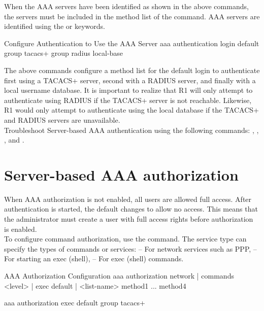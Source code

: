 When the AAA servers have been identified as shown in the above commands, the servers must be included in the method list of the  command. AAA servers are identified using the  or  keywords. 

\begin{sexylisting}{Configure Authentication to Use the AAA Server}
aaa authentication login default group tacacs+ group radius local-base
\end{sexylisting}

The above commands configure a method list for the default login to authenticate first using a TACACS+ server, second with a RADIUS server, and finally with a local username database. It is important to realize that R1 will only attempt to authenticate using RADIUS if the TACACS+ server is not reachable. Likewise, R1 would only attempt to authenticate using the local database if the TACACS+ and RADIUS servers are unavailable.\\

Troubleshoot Server-based AAA authentication using the following commands: , , , and .

\section{Server-based AAA authorization}

When AAA authorization is not enabled, all users are allowed full access. After authentication is started, the default changes to allow no access. This means that the administrator must create a user with full access rights before authorization is enabled. \\

To configure command authorization, use the  command. The service type can specify the types of commands or services:
 -- For network services such as PPP,  -- For starting an exec (shell),  -- For exec (shell) commands. 

\begin{sexylisting}{AAA Authorization Configuration}
aaa authorization {network | commands <level> | exec} {default | <list-name>} 
  method1 ... method4
  
aaa authorization exec default group tacacs+
\end{sexylisting}

